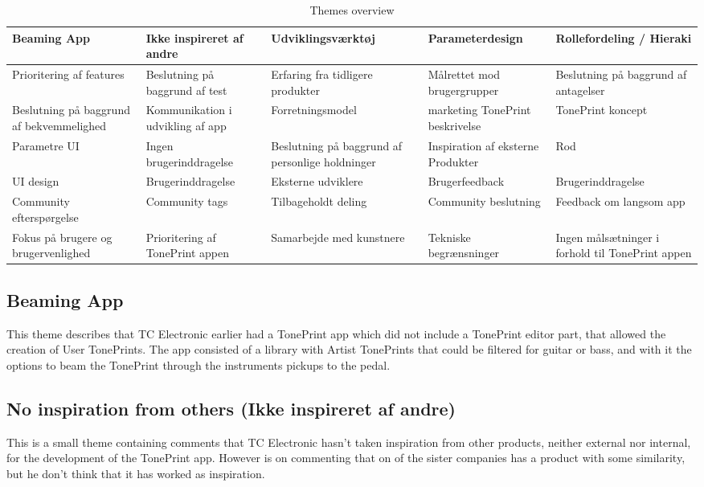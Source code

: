 \begin{table}[H]
\label{ThemesOverview}
\small
\begin{tabularx}{\textwidth}{|R|R|R|R|R|}
\hline
Beaming App & Ikke inspireret af andre & Udviklingsværktøj & Parameterdesign & Rollefordeling / Hieraki \\ \hline
Prioritering af features & Beslutning på baggrund af test & Erfaring fra tidligere produkter & Målrettet mod brugergrupper & Beslutning på baggrund af antagelser \\ \hline
Beslutning på baggrund af bekvemmelighed & Kommunikation i udvikling af app & Forretningsmodel & marketing \/ TonePrint beskrivelse & TonePrint koncept \\ \hline
 Parametre UI & Ingen brugerinddragelse & Beslutning på baggrund af personlige holdninger & Inspiration af eksterne Produkter & Rod \\ \hline
UI design & Brugerinddragelse & Eksterne udviklere & Brugerfeedback & Brugerinddragelse \\ \hline
Community efterspørgelse & Community tags & Tilbageholdt deling & Community beslutning & Feedback om langsom app \\ \hline
Fokus på brugere og brugervenlighed & Prioritering af TonePrint appen & Samarbejde med kunstnere & Tekniske begrænsninger & Ingen målsætninger i forhold til TonePrint appen \\ \hline
\end{tabularx}
\caption{Themes overview}
\end{table}

\subsection*{Beaming App}
\label{ThemeBeamingApp}
This theme describes that TC Electronic earlier had a TonePrint app which did not include a TonePrint editor part, that allowed the creation of User TonePrints. The app consisted of a library with Artist TonePrints that could be filtered for guitar or bass, and with it the options to beam the TonePrint through the instruments pickups to the pedal.

\subsection*{No inspiration from others (Ikke inspireret af andre)}
\label{ThemeNoInspirationFromOthers}
This is a small theme containing comments that TC Electronic hasn't taken inspiration from other products, neither external nor internal, for the development of the TonePrint app. However is on commenting that on of the sister companies has a product with some similarity, but he don't think that it has worked as inspiration.

